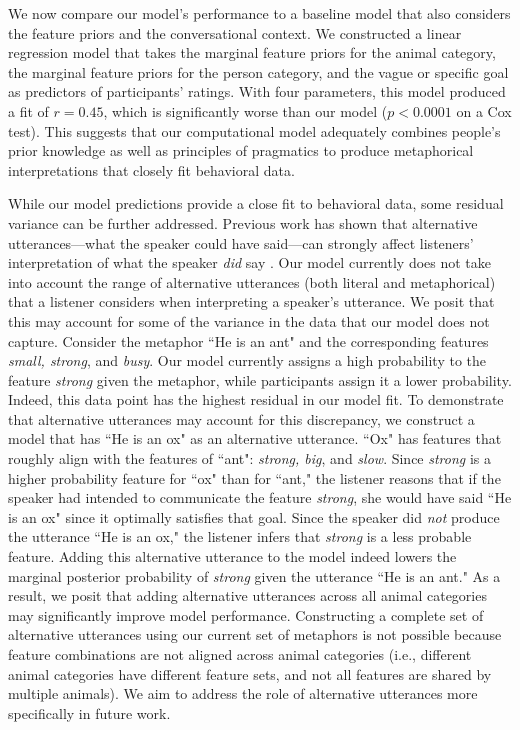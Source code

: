 \documentclass[10pt,letterpaper]{article}
\begin{document}
We now compare our model's performance to a baseline model that also considers the feature priors and the conversational context. We constructed a linear regression model that takes the marginal feature priors for the animal category, the marginal feature priors for the person category, and the vague or specific goal as predictors of participants' ratings. With four parameters, this model produced a fit of $r= 0.45$, which is significantly worse than our model ($p < 0.0001$ on a Cox test). This suggests that our computational model adequately combines people's prior knowledge as well as principles of pragmatics to produce metaphorical interpretations that closely fit behavioral data.

While our model predictions provide a close fit to behavioral data, some residual variance can be further addressed. Previous work has shown that alternative utterances---what the speaker could have said---can strongly affect listeners' interpretation of what the speaker \emph{did} say \cite{bergen2012s}. Our model currently does not take into account the range of alternative utterances (both literal and metaphorical) that a listener considers when interpreting a speaker's utterance. We posit that this may account for some of the variance in the data that our model does not capture. Consider the metaphor ``He is an ant" and the corresponding features \emph{small, strong}, and \emph{busy}. Our model currently assigns a high probability to the feature \emph{strong} given the metaphor, while participants assign it a lower probability. Indeed, this data point has the highest residual in our model fit. To demonstrate that alternative utterances may account for this discrepancy, we construct a model that has ``He is an ox" as an alternative utterance. ``Ox" has features that roughly align with the features of ``ant": \emph{strong, big}, and \emph{slow}. Since \emph{strong} is a higher probability feature for ``ox" than for ``ant," the listener reasons that if the speaker had intended to communicate the feature \emph{strong}, she would have said ``He is an ox" since it optimally satisfies that goal. Since the speaker did \emph{not} produce the utterance ``He is an ox," the listener infers that \emph{strong} is a less probable feature. Adding this alternative utterance to the model indeed lowers the marginal posterior probability of \emph{strong} given the utterance ``He is an ant." As a result, we posit that adding alternative utterances across all animal categories may significantly improve model performance. Constructing a complete set of alternative utterances using our current set of metaphors is not possible because feature combinations are not aligned across animal categories (i.e., different animal categories have different feature sets, and not all features are shared by multiple animals). We aim to address the role of alternative utterances more specifically in future work.
\end{document}
